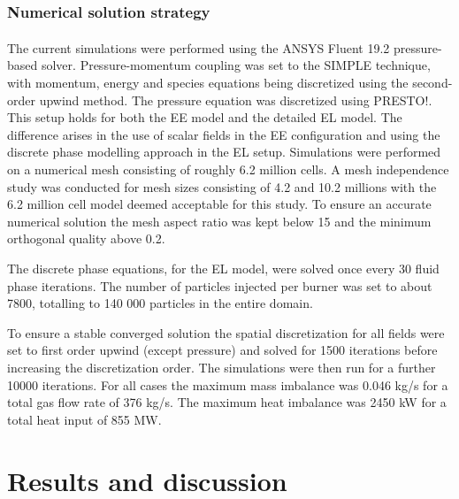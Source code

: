 \documentclass{webofc}
\begin{document}
\subsubsection{Numerical solution strategy}
The current simulations were performed using the ANSYS Fluent\textsuperscript{\textregistered} 19.2 pressure-based solver. Pressure-momentum coupling was set to the SIMPLE technique, with momentum, energy and species equations being discretized using the second-order upwind method. The pressure equation was discretized using PRESTO!. This setup holds for both the EE model and the detailed EL model. The difference arises in the use of scalar fields in the EE configuration and using the discrete phase modelling approach in the EL setup. Simulations were performed on a numerical mesh consisting of roughly 6.2 million cells. A mesh independence study was conducted for mesh sizes consisting of 4.2 and 10.2 millions with the 6.2 million cell model deemed acceptable for this study. To ensure an accurate numerical solution the mesh aspect ratio was kept below 15 and the minimum orthogonal quality above 0.2.

The discrete phase equations, for the EL model, were solved once every 30 fluid phase iterations. The number of particles injected per burner was set to about 7800, totalling to 140 000 particles in the entire domain.

To ensure a stable converged solution the spatial discretization for all fields were set to first order upwind (except pressure) and solved for 1500 iterations before increasing the discretization order. The simulations were then run for a further 10000 iterations. For all cases the maximum mass imbalance was 0.046 kg/s for a total gas flow rate of 376 kg/s. The maximum heat imbalance was 2450 kW for a total heat input of 855 MW.

\section{Results and discussion} \label{Results}
\end{document}
